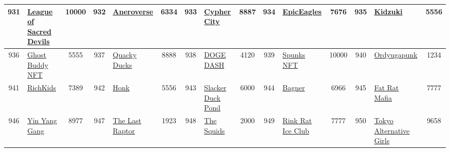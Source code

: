 \begin{table*}[]
{\begin{tabular}{|c|l|c|c|l|c|c|l|c|c|l|c|c|l|c|}
        931   & \href{https://opensea.io/collection/leagueofsacreddevils}{League of Sacred Devils} & 10000             & 932   & \href{https://opensea.io/collection/official-aneroverse}{Aneroverse}                              & 6334              & 933   & \href{http://cyphercity.io}{Cypher City}                                          & 8887              & 934   & \href{https://www.epic-eagles.com/}{EpicEagles}                               & 7676              & 935   & \href{https://opensea.io/collection/kidzuki}{Kidzuki}                                     & 5556                                    \\ \hline
        936   & \href{https://ghostbuddy.xyz/}{Ghost Buddy NFT}                                    & 5555              & 937   & \href{https://www.quackyducks.xyz}{Quacky Ducks}                                                  & 8888              & 938   & \href{https://www.hello.one/arcade/dogedash}{DOGE DASH}                           & 4120              & 939   & \href{https://nftkey.app/spunks/}{Spunks NFT}                                 & 10000             & 940   & \href{https://www.ordyugapunk.net/}{Ordyugapunk}                                          & 1234                                    \\ \hline
        941   & \href{http://richkids.io}{RichKids}                                                & 7389              & 942   & \href{http://Honknft.com/mint}{Honk}                                                              & 5556              & 943   & \href{https://www.slackerduckpond.com}{Slacker Duck Pond}                         & 6000              & 944   & \href{https://opensea.io/collection/bagner}{Bagner}                           & 6966              & 945   & \href{https://fatratmafia.com}{Fat Rat Mafia}                                             & 7777                                    \\ \hline
        946   & \href{http://yygang.io}{Yin Yang Gang}                                             & 8977              & 947   & \href{https://thelastraptor.com/}{The Last Raptor}                                                & 1923              & 948   & \href{https://thesquids.io/}{The Squids}                                          & 2000              & 949   & \href{https://www.rinkraticeclub.com}{Rink Rat Ice Club}                      & 7777              & 950   & \href{https://tag.nanataku.net/}{Tokyo Alternative Girls}                                 & 9658                                    \\ \hline

\end{tabular}}
\end{table*}
